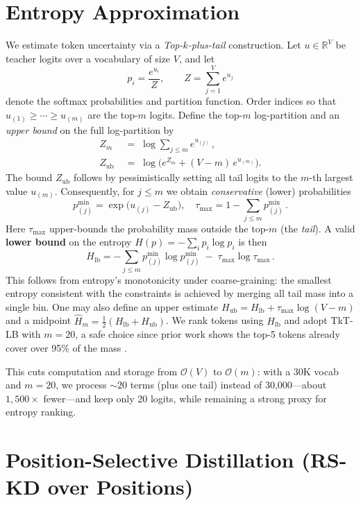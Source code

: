 \documentclass[11pt]{article}
\begin{document}
\section{Entropy Approximation}
\label{sec:entropy}
We estimate token uncertainty via a \emph{Top-$k$-plus-tail} construction. Let $u \in \mathbb{R}^V$ be teacher logits over a vocabulary of size $V$, and let
\[
	p_i = \frac{e^{u_i}}{Z},\qquad Z = \sum_{j=1}^{V} e^{u_j}
\]
denote the softmax probabilities and partition function. Order indices so that $u_{(1)} \geq \cdots \geq u_{(m)}$ are the top-$m$ logits. Define the top-$m$ log-partition and an \emph{upper bound} on the full log-partition by
\begin{align*}
	Z_m \;           & =\; \log \sum_{j \leq m} e^{u_{(j)}}\,,         \\
	Z_{\text{ub}} \; & =\; \log\Big(e^{Z_m} + (V-m)\,e^{u_{(m)}}\Big).
\end{align*}
The bound $Z_{\text{ub}}$ follows by pessimistically setting all tail logits to the $m$-th largest value $u_{(m)}$. Consequently, for $j \leq m$ we obtain \emph{conservative} (lower) probabilities
\[
	p^{\min}_{(j)} = \exp\big(u_{(j)} - Z_{\text{ub}}\big),\quad
	\tau_{\max} = 1 - \sum_{j \leq m} p^{\min}_{(j)}\,.
\]
Here $\tau_{\max}$ upper-bounds the probability mass outside the top-$m$ (the \emph{tail}). A valid \textbf{lower bound} on the entropy $H(p) = -\sum_i p_i \log p_i$ is then
\[
	H_{\text{lb}} = -\sum_{j \leq m} p^{\min}_{(j)} \log p^{\min}_{(j)} \; - \; \tau_{\max} \log \tau_{\max}\,.
\]
This follows from entropy's monotonicity under coarse-graining: the smallest entropy consistent with the constraints is achieved by merging all tail mass into a single bin.
One may also define an upper estimate $H_{\text{ub}} = H_{\text{lb}} + \tau_{\max}\log(V-m)$ and a midpoint $\widehat{H}_m = \tfrac{1}{2}(H_{\text{lb}}+H_{\text{ub}})$.
We rank tokens using $H_{\text{lb}}$ and adopt TkT-LB with $m{=}20$, a safe choice since prior work shows the top-5 tokens already cover over 95\% of the mass \citep{shum2024first}.


This cuts computation and storage from $\mathcal{O}(V)$ to $\mathcal{O}(m)$: with a 30K vocab and $m{=}20$, we process $\sim20$ terms (plus one tail) instead of 30{,}000—about $1{,}500\times$ fewer—and keep only 20 logits, while remaining a strong proxy for entropy ranking.

\section{Position-Selective Distillation (RS-KD over Positions)}
\label{sec:posrs}
\end{document}
